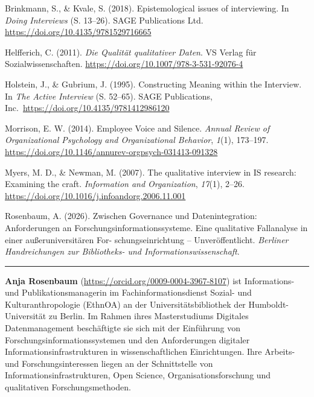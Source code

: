 \documentclass[a4paper,
fontsize=11pt,
oneside,
numbers=noperiodatend,
parskip=half-,
bibliography=totoc,
final
]{scrartcl}
\begin{document}
Brinkmann, S., \& Kvale, S. (2018). Epistemological issues of
interviewing. In \emph{Doing Interviews} (S. 13--26). SAGE Publications
Ltd. \url{https://doi.org/10.4135/9781529716665}

Helfferich, C. (2011). \emph{Die Qualität qualitativer Daten}. VS Verlag
für Sozialwissenschaften.
\url{https://doi.org/10.1007/978-3-531-92076-4}

Holstein, J., \& Gubrium, J. (1995). Constructing Meaning within the
Interview. In \emph{The Active Interview} (S. 52--65). SAGE
Publications, Inc.~\url{https://doi.org/10.4135/9781412986120}

Morrison, E. W. (2014). Employee Voice and Silence. \emph{Annual Review
of Organizational Psychology and Organizational Behavior}, \emph{1}(1),
173--197. \url{https://doi.org/10.1146/annurev-orgpsych-031413-091328}

Myers, M. D., \& Newman, M. (2007). The qualitative interview in IS
research: Examining the craft. \emph{Information and Organization},
\emph{17}(1), 2--26.
\url{https://doi.org/10.1016/j.infoandorg.2006.11.001}

Rosenbaum, A. (2026). Zwischen Governance und Datenintegration:
Anforderungen an Forschungsinformationssysteme. Eine qualitative
Fallanalyse in einer außeruniversitären
For- \linebreak schungseinrichtung -- Unveröffentlicht. \emph{Berliner Handreichungen
zur Bibliotheks- und Informationswissenschaft}.

\begin{center}\rule{0.5\linewidth}{0.5pt}\end{center}

\textbf{Anja Rosenbaum} (\url{https://orcid.org/0009-0004-3967-8107}) ist
Informations- und Publikationsmanagerin im Fachinformationsdienst
Sozial- und Kulturanthropologie (EthnOA) an der Universitätsbibliothek
der Humboldt-Universität zu Berlin. Im Rahmen ihres Masterstudiums
Digitales Datenmanagement beschäftigte sie sich mit der Einführung von
Forschungsinformationssystemen und den Anforderungen digitaler
Informationsinfrastrukturen in wissenschaftlichen Einrichtungen. Ihre
Arbeits- und Forschungsinteressen liegen an der Schnittstelle von
Informationsinfrastrukturen, Open Science, Organisationsforschung und
qualitativen Forschungsmethoden.
\end{document}
